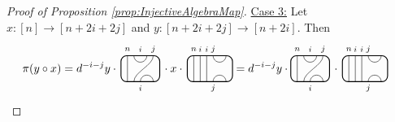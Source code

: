 \documentclass[11pt]{article}
\theoremstyle{plain}
\theoremstyle{definition}
\newcommand{\TLPlusPIso}[3]{
 \TLTStart
 \TLTThrough{#1}
 \TLTSnakeR{#2}{#3}
 \TLTEnd
}
\newcommand{\TLTCalcLabelOffset}[3][0cm]{
 \settowidth{#2}{\scriptsize{$#3$}}
 \setlength{#2}{.5#2}
 \setlength{#2}{\maxof{#2}{#1}}
}
\newcommand{\TLTEnd}{
 \draw[thick, rounded corners = 5pt] (0,0) rectangle ($ (TLTlead) + (0,.8) $);
 \end{tikzpicture}
}
\newcommand{\TLTStart}{
 \begin{tikzpicture}[baseline=.3cm]
 \coordinate (TLTlead) at (.2,0); %
 \let\TLTlabelwidth\relax
 \newlength{\TLTlabelwidth}
}
\newcommand{\TLTThrough}[1]{
 \TLTCalcLabelOffset[.2cm]{\TLTlabelwidth}{#1}
 \coordinate (TLTlead) at ($ (TLTlead) + ({\TLTlabelwidth},0) $);
 \begin{scope}[shift=(TLTlead)]
  \draw (0,0) -- (0,.8);
  \node at (0,1) {\scriptsize{$#1$}};
 \end{scope}
  \coordinate (TLTlead) at ($ (TLTlead) + ({\TLTlabelwidth},0) $);
}
\newcommand{\TLTCapcup}[1]{
 \TLTCalcLabelOffset[.2cm]{\TLTlabelwidth}{#1}
  \coordinate (TLTlead) at ($ (TLTlead) + ({\TLTlabelwidth},0) $);
 \begin{scope}[shift=(TLTlead)]
  \draw (0,0) arc (180:0:.2);
  \draw (0,.8) arc (-180:0:.2);
  \node at (0,1) {\scriptsize{$#1$}};
 \end{scope}
 \TLTCalcLabelOffset[.5cm]{\TLTlabelwidth}{#1}
 \coordinate (TLTlead) at ($ (TLTlead) + ({\TLTlabelwidth},0)$);
}
\newcommand{\TLTSnakeR}[2]{
 \let\TLTscwidth\relax
 \newlength{\TLTscwidth}
 \let\TLTsswidth\relax
 \newlength{\TLTsswidth}
 \TLTCalcLabelOffset[.2cm]{\TLTscwidth}{#1}
 \TLTCalcLabelOffset[.5cm]{\TLTsswidth}{#2}
 \setlength{\TLTlabelwidth}{\TLTscwidth+\TLTsswidth}
 \setlength{\TLTlabelwidth}{\maxof{\TLTlabelwidth}{.7cm}} %
 \coordinate (TLTlead) at ($ (TLTlead) + ({\TLTscwidth},0) $);
 \begin{scope}[shift=(TLTlead)]
  \draw (.1,.8) arc (-180:0:.2cm);
  \draw (.1,0) .. controls ++(90:.3cm) and ++(270:.3cm) .. ($ (.1,.8) + ({\TLTlabelwidth},0) $);
  \draw ($ (.1,0) + ({\TLTsswidth},0) $) arc (180:0:.2cm);
  \node at (.1,1) {\scriptsize{$#1$}};
  \node at ($ (.1,1) + ({\TLTlabelwidth},0) $) {\scriptsize{$#2$}};
  \node at ($ (.1,-.2) + ({\TLTsswidth},0) $) {\scriptsize{$#1$}};
 \end{scope}
 \coordinate (TLTlead) at ($ (TLTlead) + ({\TLTlabelwidth+\TLTsswidth},0) $);
}
\begin{document}
\begin{proof}[Proof of Proposition \ref{prop:InjectiveAlgebraMap}]
\item[\underline{Case 3:}]
Let $x:[n]\rightarrow [n+2i+2j]$ and $y:[n+2i+2j]\rightarrow [n+2i]$.
Then 
\begin{align*}
 \pi(y\circ x) 
 &= 
 d^{-i-j}
 y\cdot\,
 \begin{tikzpicture}[baseline=.3cm]
  \draw (.2,0) -- (.2,.8);
  \node at (.2,1) {\scriptsize{$n$}};
  \draw (.6,0) arc (180:0:.2cm);
  \node at (.6,-.2) {\scriptsize{$i$}};
  \draw (.4,0) .. controls ++(90:.3cm) and ++(270:.3cm) .. (1,.8);
  \node at (1,1) {\scriptsize{$j$}};
  \draw (.4,.8) arc (-180:0:.2cm);
  \node at (.6,1) {\scriptsize{$i$}};
  \draw[thick, rounded corners = 5pt] (0,0) rectangle (1.2,.8);
 \end{tikzpicture}
 \,\cdot x \cdot\,
 \begin{tikzpicture}[baseline=.3cm]
  \draw (.2,0) -- (.2,.8);
  \node at (.2,1) {\scriptsize{$n$}};
  \draw (.4,0) -- (.4,.8);
  \node at (.4,1) {\scriptsize{$i$}};
  \draw (.6,0) -- (.6,.8);
  \node at (.6,1) {\scriptsize{$i$}};
  \draw (.8,0) arc (180:0:.2cm);
  \node at (.8,-.2) {\scriptsize{$j$}};
  \draw (.8,.8) arc (-180:0:.2cm);
  \node at (.8,1) {\scriptsize{$j$}};
  \draw[thick, rounded corners = 5pt] (0,0) rectangle (1.4,.8);
 \end{tikzpicture}
 =
 d^{-i-j}
 y\cdot
 \begin{tikzpicture}[baseline=.3cm]
  \draw (.2,0) -- (.2,.8);
  \node at (.2,1) {\scriptsize{$n$}};
  \draw (.6,0) arc (180:0:.2cm);
  \node at (.6,-.2) {\scriptsize{$i$}};
  \draw (.4,0) .. controls ++(90:.3cm) and ++(270:.3cm) .. (1,.8);
  \node at (1,1) {\scriptsize{$j$}};
  \draw (.4,.8) arc (-180:0:.2cm);
  \node at (.6,1) {\scriptsize{$i$}};
  \draw[thick, rounded corners = 5pt] (0,0) rectangle (1.2,.8);
 \end{tikzpicture}
\,\cdot\,
 \begin{tikzpicture}[baseline=.3cm]
  \draw (.2,0) -- (.2,.8);
  \node at (.2,1) {\scriptsize{$n$}};
  \draw (.4,0) -- (.4,.8);
  \node at (.4,1) {\scriptsize{$i$}};
  \draw (.6,0) -- (.6,.8);
  \node at (.6,1) {\scriptsize{$i$}};
  \draw (.8,0) arc (180:0:.2cm);
  \node at (.8,-.2) {\scriptsize{$j$}};
  \draw (.8,.8) arc (-180:0:.2cm);
  \node at (.8,1) {\scriptsize{$j$}};
  \draw[thick, rounded corners = 5pt] (0,0) rectangle (1.4,.8);
 \end{tikzpicture}

\end{align*}
\end{proof}
\end{document}
